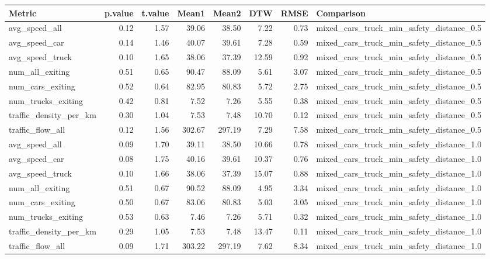 \begin{table}[ht]
\centering
\begin{tabular}{lrrrrrrl}
  \hline
Metric & p.value & t.value & Mean1 & Mean2 & DTW & RMSE & Comparison \\
  \hline
avg\_speed\_all & 0.12 & 1.57 & 39.06 & 38.50 & 7.22 & 0.73 & mixed\_cars\_truck\_min\_safety\_distance\_0.5 \\
  avg\_speed\_car & 0.14 & 1.46 & 40.07 & 39.61 & 7.28 & 0.59 & mixed\_cars\_truck\_min\_safety\_distance\_0.5 \\
  avg\_speed\_truck & 0.10 & 1.65 & 38.06 & 37.39 & 12.59 & 0.92 & mixed\_cars\_truck\_min\_safety\_distance\_0.5 \\
  num\_all\_exiting & 0.51 & 0.65 & 90.47 & 88.09 & 5.61 & 3.07 & mixed\_cars\_truck\_min\_safety\_distance\_0.5 \\
  num\_cars\_exiting & 0.52 & 0.64 & 82.95 & 80.83 & 5.72 & 2.75 & mixed\_cars\_truck\_min\_safety\_distance\_0.5 \\
  num\_trucks\_exiting & 0.42 & 0.81 & 7.52 & 7.26 & 5.55 & 0.38 & mixed\_cars\_truck\_min\_safety\_distance\_0.5 \\
  traffic\_density\_per\_km & 0.30 & 1.04 & 7.53 & 7.48 & 10.70 & 0.12 & mixed\_cars\_truck\_min\_safety\_distance\_0.5 \\
  traffic\_flow\_all & 0.12 & 1.56 & 302.67 & 297.19 & 7.29 & 7.58 & mixed\_cars\_truck\_min\_safety\_distance\_0.5 \\
  avg\_speed\_all & 0.09 & 1.70 & 39.11 & 38.50 & 10.66 & 0.78 & mixed\_cars\_truck\_min\_safety\_distance\_1.0 \\
  avg\_speed\_car & 0.08 & 1.75 & 40.16 & 39.61 & 10.37 & 0.76 & mixed\_cars\_truck\_min\_safety\_distance\_1.0 \\
  avg\_speed\_truck & 0.10 & 1.66 & 38.06 & 37.39 & 15.07 & 0.88 & mixed\_cars\_truck\_min\_safety\_distance\_1.0 \\
  num\_all\_exiting & 0.51 & 0.67 & 90.52 & 88.09 & 4.95 & 3.34 & mixed\_cars\_truck\_min\_safety\_distance\_1.0 \\
  num\_cars\_exiting & 0.50 & 0.67 & 83.06 & 80.83 & 5.03 & 3.05 & mixed\_cars\_truck\_min\_safety\_distance\_1.0 \\
  num\_trucks\_exiting & 0.53 & 0.63 & 7.46 & 7.26 & 5.71 & 0.32 & mixed\_cars\_truck\_min\_safety\_distance\_1.0 \\
  traffic\_density\_per\_km & 0.29 & 1.05 & 7.53 & 7.48 & 13.47 & 0.11 & mixed\_cars\_truck\_min\_safety\_distance\_1.0 \\
  traffic\_flow\_all & 0.09 & 1.71 & 303.22 & 297.19 & 7.62 & 8.34 & mixed\_cars\_truck\_min\_safety\_distance\_1.0 \\
   \hline
\end{tabular}
\end{table}
